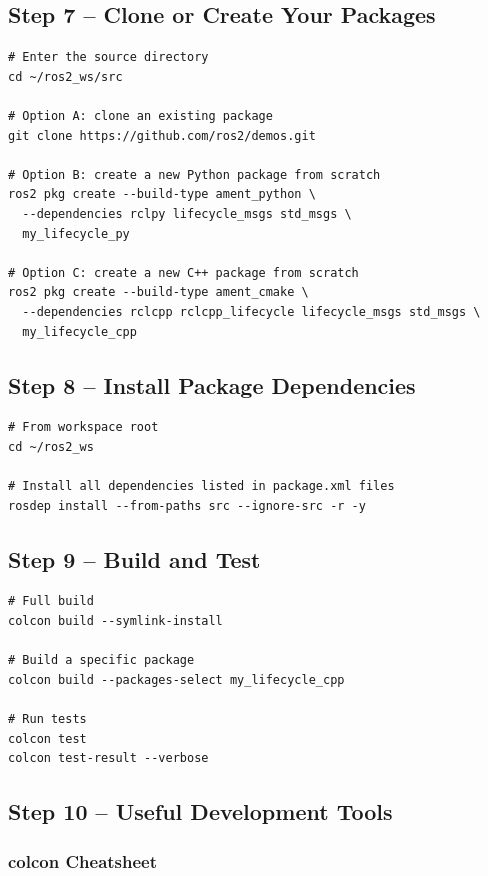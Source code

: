\documentclass[12pt,a4paper]{article}
\begin{document}
\subsection{Step 7 -- Clone or Create Your Packages}

\begin{lstlisting}[style=bash]
# Enter the source directory
cd ~/ros2_ws/src

# Option A: clone an existing package
git clone https://github.com/ros2/demos.git

# Option B: create a new Python package from scratch
ros2 pkg create --build-type ament_python \
  --dependencies rclpy lifecycle_msgs std_msgs \
  my_lifecycle_py

# Option C: create a new C++ package from scratch
ros2 pkg create --build-type ament_cmake \
  --dependencies rclcpp rclcpp_lifecycle lifecycle_msgs std_msgs \
  my_lifecycle_cpp
\end{lstlisting}

\subsection{Step 8 -- Install Package Dependencies}

\begin{lstlisting}[style=bash]
# From workspace root
cd ~/ros2_ws

# Install all dependencies listed in package.xml files
rosdep install --from-paths src --ignore-src -r -y
\end{lstlisting}

\subsection{Step 9 -- Build and Test}

\begin{lstlisting}[style=bash]
# Full build
colcon build --symlink-install

# Build a specific package
colcon build --packages-select my_lifecycle_cpp

# Run tests
colcon test
colcon test-result --verbose
\end{lstlisting}

\subsection{Step 10 -- Useful Development Tools}

\subsubsection{colcon Cheatsheet}
\end{document}

